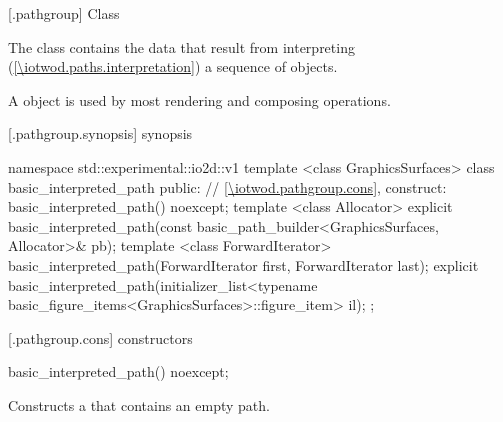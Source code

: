  [\iotwod.pathgroup] {Class }

\pnum
{}%
The class  contains the data that result from interpreting (\ref{\iotwod.paths.interpretation}) a sequence of  objects. %

\pnum
A  object is used by most rendering and composing operations.

%
%
%
%
 [\iotwod.pathgroup.synopsis] { synopsis}

\begin{codeblock}
namespace std::experimental::io2d::v1 {
  template <class GraphicsSurfaces>
  class basic_interpreted_path {
  public:
    // \ref{\iotwod.pathgroup.cons}, construct:
    basic_interpreted_path() noexcept;
    template <class Allocator>
    explicit basic_interpreted_path(const basic_path_builder<GraphicsSurfaces, Allocator>& pb);
    template <class ForwardIterator>
    basic_interpreted_path(ForwardIterator first, ForwardIterator last);
    explicit basic_interpreted_path(initializer_list<typename
      basic_figure_items<GraphicsSurfaces>::figure_item> il);
  };
}
\end{codeblock}

 [\iotwod.pathgroup.cons] { constructors}

%
\begin{itemdecl}
basic_interpreted_path() noexcept;
\end{itemdecl}
\begin{itemdescr}
\pnum
\effects
Constructs a  that contains an empty path.
\end{itemdescr}

